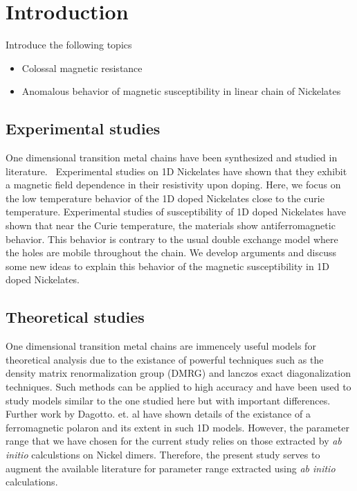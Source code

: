 \documentclass[12pt,twoside]{report}
\begin{document}
	\tableofcontents
	\chapter*{Introduction}
	
	Introduce the following topics
	\begin{itemize}
		\item Colossal magnetic resistance
		\item Anomalous behavior of magnetic susceptibility in linear chain of Nickelates
	\end{itemize}
	
	\section*{Experimental studies}
	
	One dimensional transition metal chains have been synthesized and studied in
	literature.~\cite{darriet_compound_1993,batlogg_haldane_1994} Experimental
	studies on 1D Nickelates have shown that they exhibit a magnetic field
	dependence in their resistivity upon doping.\cite{xu_holes_2000} Here, we focus
	on the low temperature behavior of the 1D doped Nickelates close to the curie
	temperature. Experimental studies of susceptibility of 1D doped Nickelates have
	shown that near the Curie temperature, the materials show antiferromagnetic
	behavior.\cite{Ramirez} This behavior is contrary to the usual double exchange
	model where the holes are mobile throughout the chain. We develop arguments and
	discuss some new ideas to explain this behavior of the magnetic susceptibility
	in 1D doped Nickelates.
	
	\section*{Theoretical studies}
	
	One dimensional transition metal chains are immencely useful models
	for theoretical analysis due to the existance of powerful techniques
	such as the density matrix renormalization group (DMRG) and lanczos
	exact diagonalization techniques. Such methods can be applied to
	high accuracy and have been used to study models similar to the
	one studied here but with important differences.\cite{dagotto_correlated_1994,patel_emergence_2020}
	Further work by Dagotto. et. al have shown details of the existance
	of a ferromagnetic polaron and its extent in such 1D models.\cite{malvezzi_origin_2001} However, the parameter range
	that we have chosen for the current study relies on those extracted
	by \textit{ab initio} calculstions on Nickel dimers.\cite{bastardis_microscopic_2007,bastardis_isotropic_2008}
	Therefore, the present study serves to augment the available literature
	for parameter range extracted using \textit{ab initio} calculations.
	
\end{document}
